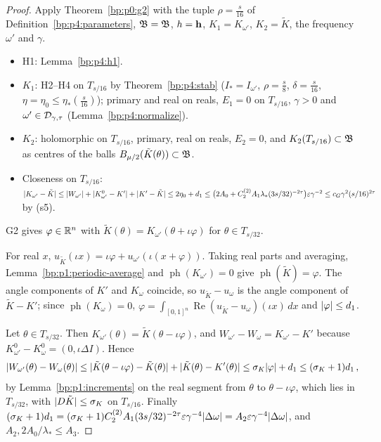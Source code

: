\begin{proof}
\label{step:p4:lip-g2}
Apply Theorem~\ref{bp:p0:g2} with the tuple $\rho=\frac s{16}$ of Definition~\ref{bp:p4:parameters},
$\mathfrak B=\mathfrak{B}$, $h=\mathbf{h}$, $K_1=K_{\omega'}$, $K_2=\tilde K$, the frequency $\omega'$ and $\gamma$.
\begin{itemize}
\item H1: Lemma~\ref{bp:p4:h1}.
\item $K_1$: H2--H4 on $T_{s/16}$ by Theorem~\ref{bp:p4:stab} ($I_*=I_{\omega'}$, $\rho=\frac s8$,
  $\delta=\frac s{16}$, $\eta=\eta_0\le\eta_*(\frac s{16})$); primary and real on reals, $E_1=0$ on
  $T_{s/16}$, $\gamma>0$ and $\omega'\in\mathcal{D}_{\gamma,\tau}$ (Lemma~\ref{bp:p4:normalize}).
\item $K_2$: holomorphic on $T_{s/16}$, primary, real on reals, $E_2=0$, and
  $K_2(T_{s/16})\subset\mathfrak{B}$ as centres of the balls $B_{\mu/2}(\tilde K(\theta))\subset\mathfrak{B}$.
\item Closeness on $T_{s/16}$:
  $\lvert K_{\omega'}-\tilde K\rvert\le\lvert W_{\omega'}\rvert+\lvert K^0_{\omega'}-K'\rvert+\lvert K'-\tilde K\rvert\le2\eta_0+d_1\le\bigl(2A_0+C_2^{(2)}A_1\lambda_*(3s/32)^{-2\tau}\bigr)\varepsilon\gamma^{-2}\le c_G\gamma^2(s/16)^{2\tau}$
  by (s5).
\end{itemize}
G2 gives $\varphi\in\mathbb{R}^n$ with $\tilde K(\theta)=K_{\omega'}(\theta+\iota\varphi)$ for $\theta\in T_{s/32}$.

\label{step:p4:lip-phase}
For real $x$, $u_{\tilde K}(\iota x)=\iota\varphi+u_{\omega'}(\iota(x+\varphi))$. Taking real parts and
averaging, Lemma~\ref{bp:p1:periodic-average} and $\operatorname{ph}(K_{\omega'})=0$ give
$\operatorname{ph}(\tilde K)=\varphi$. The angle components of $K'$ and $K_\omega$ coincide, so
$u_{\tilde K}-u_\omega$ is the angle component of $\tilde K-K'$; since $\operatorname{ph}(K_\omega)=0$,
$\varphi=\int_{[0,1]^n}\operatorname{Re}(u_{\tilde K}-u_\omega)(\iota x)\,dx$ and $\lvert \varphi\rvert\le d_1$.

\label{step:p4:lip-close}
Let $\theta\in T_{s/32}$. Then $K_{\omega'}(\theta)=\tilde K(\theta-\iota\varphi)$, and
$W_{\omega'}-W_\omega=K_{\omega'}-K'$ because $K^0_{\omega'}-K^0_\omega=(0,\iota\Delta I)$. Hence
\begin{equation*}
\lvert W_{\omega'}(\theta)-W_\omega(\theta)\rvert\le\lvert \tilde K(\theta-\iota\varphi)-\tilde K(\theta)\rvert+\lvert \tilde K(\theta)-K'(\theta)\rvert\le\sigma_K\lvert \varphi\rvert+d_1\le(\sigma_K+1)d_1\,,
\end{equation*}
by Lemma~\ref{bp:p1:increments} on the real segment from $\theta$ to $\theta-\iota\varphi$, which lies
in $T_{s/32}$, with $\lvert D\tilde K\rvert\le\sigma_K$ on $T_{s/16}$. Finally
$(\sigma_K+1)d_1=(\sigma_K+1)C_2^{(2)}A_1(3s/32)^{-2\tau}\varepsilon\gamma^{-4}\lvert \Delta\omega\rvert=A_2\varepsilon\gamma^{-4}\lvert \Delta\omega\rvert$,
and $A_2,2A_0/\lambda_*\le A_3$.
\end{proof}

